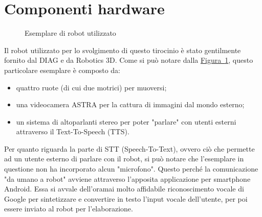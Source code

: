 \documentclass[italian, twoside]{sapthesis} %
\begin{document}
\section{Componenti hardware}
\begin{figure}[H]
    \centering
    \caption{Esemplare di robot utilizzato}
    \label{fig:robot}
\end{figure}

Il robot utilizzato per lo svolgimento di questo tirocinio è stato gentilmente fornito dal DIAG e da Robotics 3D. Come si può notare dalla \hyperref[fig:robot]{Figura~\ref*{fig:robot}}, questo particolare esemplare è composto da:

\begin{itemize}
	\item quattro ruote (di cui due motrici) per muoversi;
	\item una videocamera ASTRA per la cattura di immagini dal mondo esterno;
	\item un sistema di altoparlanti stereo per poter "parlare" con utenti esterni attraverso il Text-To-Speech (TTS).
\end{itemize}

Per quanto riguarda la parte di STT (Speech-To-Text), ovvero ciò che permette ad un utente esterno di parlare con il robot, si può notare che l'esemplare in questione non ha incorporato alcun "microfono". Questo perché la comunicazione "da umano a robot" avviene attraverso l'apposita applicazione per smartphone Android. Essa si avvale dell'oramai molto affidabile riconoscimento vocale di Google per sintetizzare e convertire in testo l'input vocale dell'utente, per poi essere inviato al robot per l'elaborazione.
\end{document}
